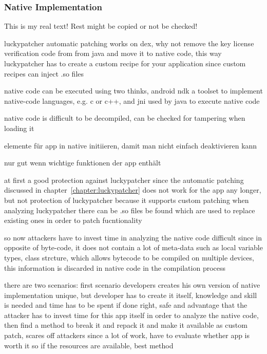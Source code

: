 \subsubsection{Native Implementation} \label{subsection:counter-modifications-dynamic}
This is my real text! Rest might be copied or not be checked!

luckypatcher automatic patching works on dex, why not remove the key license verification code from from java and move it to native code, this way luckypatcher has to create a custom recipe for your application since custom recipes can inject .so files

native code can be executed using two thinks, android ndk a toolset to implement native-code languages, e.g. c or c++, and  \gls{jni} used by java to execute native code

native code is difficult to be decompiled, can be checked for tampering when loading it

elemente für app in native initiieren, damit man nicht einfach deaktivieren kann

nur gut wenn wichtige funktionen der app enthält



at first a good protection against luckypatcher since the automatic patching discussed in chapter~\ref{chapter:luckypatcher} does not work for the app any longer, but not protection of luckypatcher because it supports custom patching
when analyzing luckypatcher there can be .so files be found which are used to replace existing ones in order to patch fucntionality

so now attackers have to invest time in analyzing the native code
difficult since in opposite of byte-code, it does not contain a lot of meta-data such as local variable types, class strcture, which allows bytecode to be compiled on multiple devices, this information is discarded in native code in the compilation process

there are two scenarios:
first scenario
developers creates his own version of native implementation
unique, but developer has to create it itself, knowledge and skill is needed and time has to be spent
if done right, safe and advantage that the attacker has to invest time for this app itself in order to analyze the native code, then find a method to break it and repack it and make it available as custom patch, scares off attackers since a lot of work, have to evaluate whether app is worth it
so if the resources are available, best method

